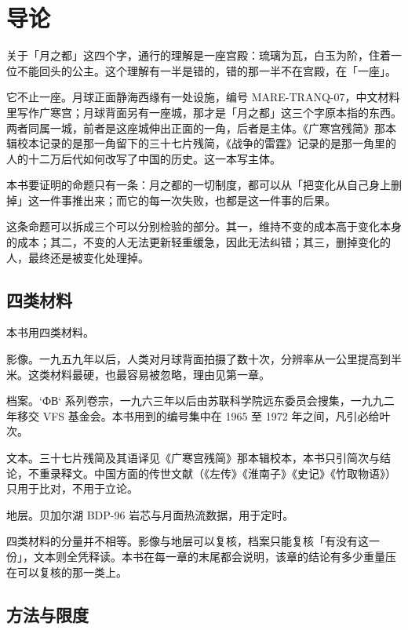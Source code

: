 \chapter*{导\quad 论}
{}

\noindent
关于「月之都」这四个字，通行的理解是一座宫殿：琉璃为瓦，白玉为阶，住着一位不能回头的公主。这个理解有一半是错的，错的那一半不在宫殿，在「一座」。

它不止一座。月球正面静海西缘有一处设施，编号 MARE-TRANQ-07，中文材料里写作广寒宫；月球背面另有一座城，那才是「月之都」这三个字原本指的东西。两者同属一城，前者是这座城伸出正面的一角，后者是主体。《广寒宫残简》那本辑校本记录的是那一角留下的三十七片残简，《战争的雷霆》记录的是那一角里的人的十二万后代如何改写了中国的历史。这一本写主体。

本书要证明的命题只有一条：月之都的一切制度，都可以从「把变化从自己身上删掉」这一件事推出来；而它的每一次失败，也都是这一件事的后果。

这条命题可以拆成三个可以分别检验的部分。其一，维持不变的成本高于变化本身的成本；其二，不变的人无法更新轻重缓急，因此无法纠错；其三，删掉变化的人，最终还是被变化处理掉。

\section*{四类材料}

本书用四类材料。

影像。一九五九年以后，人类对月球背面拍摄了数十次，分辨率从一公里提高到半米。这类材料最硬，也最容易被忽略，理由见第一章。

档案。`ФВ` 系列卷宗，一九六三年以后由苏联科学院远东委员会搜集，一九九二年移交 VFS 基金会。本书用到的编号集中在 1965 至 1972 年之间，凡引必给叶次。

文本。三十七片残简及其语译见《广寒宫残简》那本辑校本，本书只引简次与结论，不重录释文。中国方面的传世文献（《左传》《淮南子》《史记》《竹取物语》）只用于比对，不用于立论。

地层。贝加尔湖 BDP-96 岩芯与月面热流数据，用于定时。

四类材料的分量并不相等。影像与地层可以复核，档案只能复核「有没有这一份」，文本则全凭释读。本书在每一章的末尾都会说明，该章的结论有多少重量压在可以复核的那一类上。

\section*{方法与限度}

